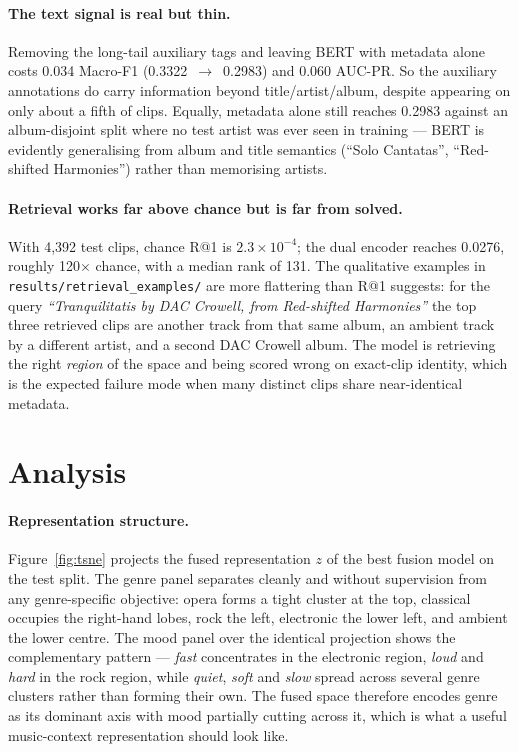 \documentclass{article}
\begin{document}
\paragraph{The text signal is real but thin.} Removing the long-tail auxiliary
tags and leaving BERT with metadata alone costs 0.034 Macro-F1
(0.3322~$\rightarrow$~0.2983) and 0.060 AUC-PR. So the auxiliary annotations do
carry information beyond title/artist/album, despite appearing on only about a
fifth of clips. Equally, metadata alone still reaches 0.2983 against an
album-disjoint split where no test artist was ever seen in training --- BERT is
evidently generalising from album and title semantics (``Solo Cantatas'',
``Red-shifted Harmonies'') rather than memorising artists.

\paragraph{Retrieval works far above chance but is far from solved.} With 4{,}392
test clips, chance R@1 is $2.3\times10^{-4}$; the dual encoder reaches 0.0276,
roughly 120$\times$ chance, with a median rank of 131. The qualitative examples
in \texttt{results/retrieval\_examples/} are more flattering than R@1 suggests:
for the query \textit{``Tranquilitatis by DAC Crowell, from Red-shifted
Harmonies''} the top three retrieved clips are another track from that same
album, an ambient track by a different artist, and a second DAC Crowell album.
The model is retrieving the right \emph{region} of the space and being scored
wrong on exact-clip identity, which is the expected failure mode when many
distinct clips share near-identical metadata.

\section{Analysis}
\label{sec:analysis}

\paragraph{Representation structure.} Figure~\ref{fig:tsne} projects the fused
representation $z$ of the best fusion model on the test split. The genre panel
separates cleanly and without supervision from any genre-specific objective:
opera forms a tight cluster at the top, classical occupies the right-hand
lobes, rock the left, electronic the lower left, and ambient the lower centre.
The mood panel over the identical projection shows the complementary pattern ---
\textit{fast} concentrates in the electronic region, \textit{loud} and
\textit{hard} in the rock region, while \textit{quiet}, \textit{soft} and
\textit{slow} spread across several genre clusters rather than forming their
own. The fused space therefore encodes genre as its dominant axis with mood
partially cutting across it, which is what a useful music-context representation
should look like.
\end{document}
